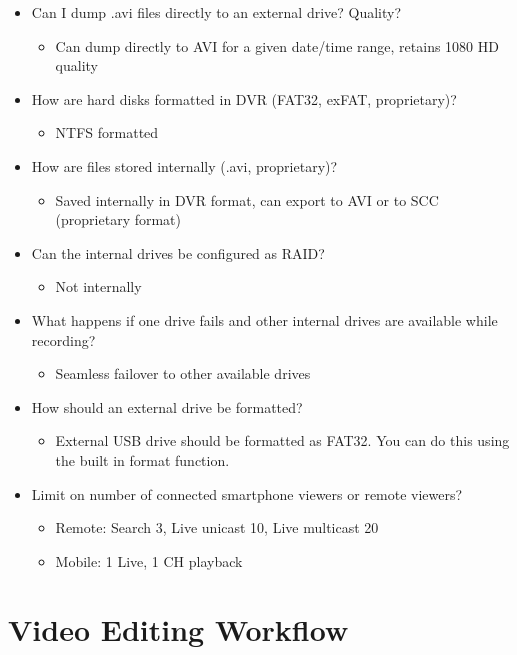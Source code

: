 \documentclass[11pt,oneside]{book}
\begin{document}
\begin{itemize}
\item Can I dump .avi files directly to an external drive? Quality?
    \begin{itemize}
    \item Can dump directly to AVI for a given date/time range, retains 1080 HD quality
    \end{itemize}
\item How are hard disks formatted in DVR (FAT32, exFAT, proprietary)?
    \begin{itemize}
    \item NTFS formatted
    \end{itemize}
\item How are files stored internally (.avi, proprietary)?
    \begin{itemize}
    \item Saved internally in DVR format, can export to AVI or to SCC (proprietary format)
    \end{itemize}
\item Can the internal drives be configured as RAID?
    \begin{itemize}
    \item Not internally
    \end{itemize}
\item What happens if one drive fails and other internal drives are available while recording?
    \begin{itemize}
    \item Seamless failover to other available drives
    \end{itemize}
\item How should an external drive be formatted?
    \begin{itemize}
    \item External USB drive should be formatted as FAT32. You can do this using the built in format function.
    \end{itemize}
\item Limit on number of connected smartphone viewers or remote viewers?
    \begin{itemize}
    \item Remote: Search 3, Live unicast 10, Live multicast 20
    \item Mobile: 1 Live, 1 CH playback
    \end{itemize}
\end{itemize}

\section{Video Editing Workflow}
\end{document}
